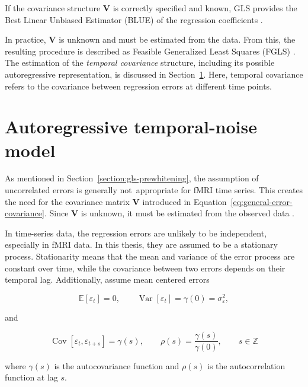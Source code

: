 \documentclass[english]{pwr_wmat_praca_dyplomowa}
\theoremstyle{definition}
\theoremstyle{remark}
\begin{document}
If the covariance structure $\mathbf{V}$ is correctly specified and known, GLS provides the Best Linear Unbiased Estimator (BLUE) of the regression coefficients \cite{agresti, woolrich-temporal-autocorrelation, bullmore-fmri-estimation}.

In practice, $\mathbf{V}$ is unknown and must be estimated from the data. From this, the resulting procedure is described as Feasible Generalized Least Squares (FGLS) \cite{fgls}. The estimation of the \textit{temporal covariance} structure, including its possible autoregressive representation, is discussed in Section~\ref{section:ar-noise-model}. Here, temporal covariance refers to the covariance between regression errors at different time points.


\section{Autoregressive temporal-noise model}
\label{section:ar-noise-model}

As mentioned in Section~\ref{section:gls-prewhitening}, the assumption of uncorrelated errors is generally not~appropriate for fMRI time series. This creates the need for the covariance matrix $\mathbf{V}$ introduced in Equation~\eqref{eq:general-error-covariance}. Since $\mathbf{V}$ is unknown, it must be estimated from the observed data
\newline
\cite[Section 2.7.3]{agresti}.

In time-series data, the regression errors are unlikely to be independent, especially in fMRI data. In this thesis, they are assumed to be a stationary process. Stationarity means that the mean and variance of the error process are constant over time, while the covariance between two errors depends on their temporal lag. Additionally, assume mean centered errors

\begin{equation}
    \mathbb{E}\left[\varepsilon_t\right] = 0, \qquad \operatorname{Var}\left[\varepsilon_t\right] = \gamma(0) = \sigma_\varepsilon^2,
\end{equation}

and

\begin{equation} 
    \operatorname{Cov} \left[\varepsilon_t, \varepsilon_{t+s} \right] = \gamma(s), \qquad \rho(s) = \frac{\gamma(s)}{\gamma(0)}, \qquad s \in \mathbb{Z}
\end{equation}

where $\gamma(s)$ is the autocovariance function and $\rho(s)$ is the autocorrelation function at lag $s$.
\end{document}
